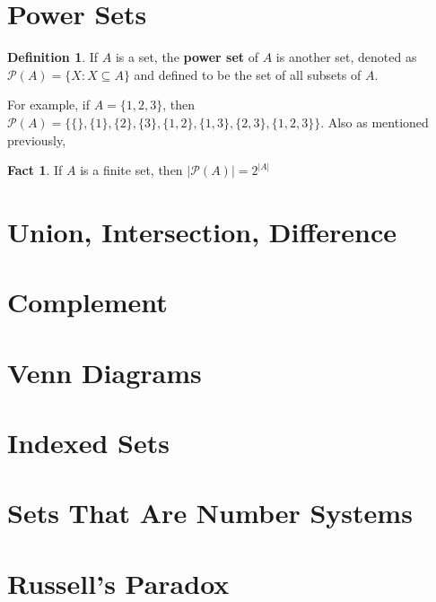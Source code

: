 \documentclass[10pt]{article}
\theoremstyle{definition}
\newtheorem{definition}{Definition}
\newtheorem{fact}{Fact}
\begin{document}
    \section{Power Sets}
    \begin{definition}
        If $A$ is a set, the \textbf{power set} of $A$ is another set, denoted as $\mathscr{P}(A) = \{X: X \subseteq A\}$ and defined to be the set of all subsets of $A$.
    \end{definition}

    For example, if $A = \{1,2,3\}$, then $\mathscr{P}(A) =\{\{\},\{1\},\{2\},\{3\},\{1,2\},\{1,3\},\{2,3\},\{1,2,3\}\}$. Also as mentioned previously, 
    
    \begin{fact}
        If $A$ is a finite set, then $|\mathscr{P}(A)| = 2^{|A|}$
        
    \end{fact}



    \section{Union, Intersection, Difference}

    \section{Complement}

    \section{Venn Diagrams}

    \section{Indexed Sets}

    \section{Sets That Are Number Systems}

    \section{Russell's Paradox}

    
\end{document}

